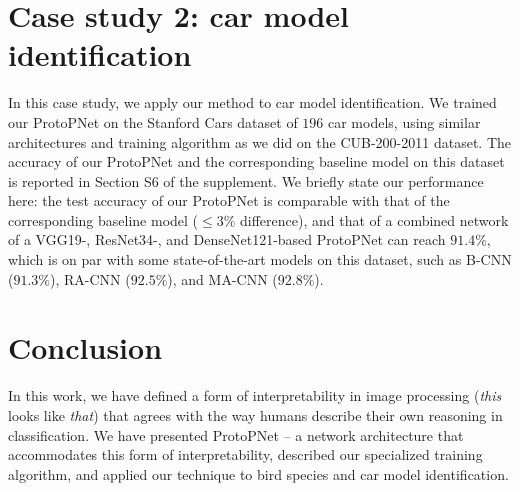 \documentclass{article}
\theoremstyle{definition}
\theoremstyle{remark}
\begin{document}
\section{Case study 2: car model identification}
%
In this case study, we apply our method to car model identification. We trained our ProtoPNet on the Stanford Cars dataset \cite{KrauseStarkDengFei-Fei_3DRR2013} of $196$ car models, using similar architectures and training algorithm as we did on the CUB-200-2011 dataset. The accuracy of our ProtoPNet and the corresponding baseline model on this dataset is reported in Section S6 of the supplement. We briefly state our performance here: the test accuracy of our ProtoPNet is comparable with that of the corresponding baseline model ($\leq 3\%$ difference), and that of a combined network of a VGG19-, ResNet34-, and DenseNet121-based ProtoPNet can reach $91.4\%$, which is on par with some state-of-the-art models on this dataset, such as B-CNN \cite{lin2015bilinear} ($91.3\%$), RA-CNN \cite{fu2017look} ($92.5\%$), and MA-CNN \cite{zheng2017learning} ($92.8\%$).




\section{Conclusion}
%
In this work, we have defined a form of interpretability in image processing (\textit{this} looks like \textit{that}) that agrees with the way humans describe their own reasoning in classification. We have presented ProtoPNet -- a network architecture that accommodates this form of interpretability,
described our specialized training algorithm, and applied our technique to bird species and car model identification.
\end{document}
